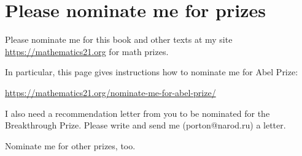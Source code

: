 \chapter{Please nominate me for prizes}

Please nominate me for this book and other texts
at my site \url{https://mathematics21.org} for math prizes.

In particular, this page gives instructions how to nominate
me for Abel Prize:

\url{https://mathematics21.org/nominate-me-for-abel-prize/}

I also need a recommendation letter from you to be nominated
for the Breakthrough Prize. Please write and send me
(porton@narod.ru) a letter.

Nominate me for other prizes, too.
